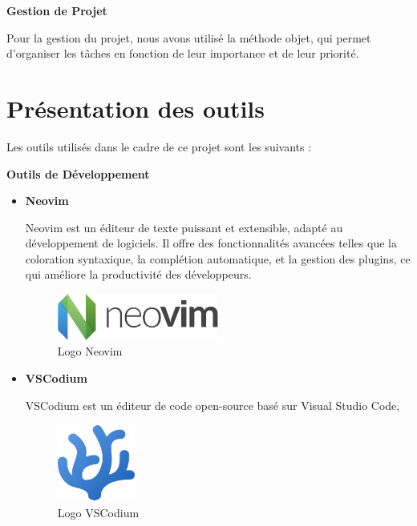 \textbf{Gestion de Projet}

  Pour la gestion du projet, nous avons utilisé la méthode objet, qui permet
  d'organiser les tâches en fonction de leur importance et de leur priorité.


\section{Présentation des outils}
Les outils utilisés dans le cadre de ce projet sont les suivants :

\textbf{Outils de Développement}
\begin{itemize}
  \item \textbf{Neovim}

    Neovim est un éditeur de texte puissant et extensible, adapté au
    développement de logiciels. Il offre des fonctionnalités avancées telles
    que la coloration syntaxique, la complétion automatique, et la gestion
    des plugins, ce qui améliore la productivité des développeurs.

    \newpage
    \begin{figure}[htbp]
      \centering
      \includegraphics[width=0.5\textwidth]{images/Neovim-logo.png}
      \caption{Logo Neovim}
    \end{figure}

  \item \textbf{VSCodium}

    VSCodium est un éditeur de code open-source basé sur Visual Studio Code,
    \begin{figure}[htbp]
      \centering
      \includegraphics[width=1.0in, height=1.0in]{images/codium_cnl.png}
      \caption{Logo VSCodium}
    \end{figure}
\end{itemize}

